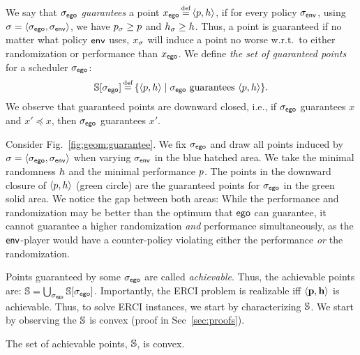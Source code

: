 We say that ${\sigma_{\mathsf{ego}}}$ \emph{guarantees} a point $x_\pOne \eqdef
\langle \scp, \rndp \rangle$, if for every policy ${\sigma_{\mathsf{env}}}$, using
$\sigma = \langle {\sigma_{\mathsf{ego}}}, {\sigma_{\mathsf{env}}} \rangle$, we have
$p_\sigma \geq p$ and $h_\sigma \geq h$. Thus, a point
is guaranteed if no matter what policy $\mathsf{env}$ uses, $x_\sigma$ will
induce a point no worse w.r.t.\ to either randomization or performance
than $x_{\mathsf{ego}}$. 
We define
\emph{the set of guaranteed points} for a scheduler ${\sigma_{\mathsf{ego}}}$:
\begin{equation}\label{eq:guaranteed}
  \solutions[\pOneSched] \eqdef \{ \langle \scp, \rndp \rangle \mid  \pOneSched \text{ guarantees } \langle \scp, \rndp \rangle \}.
\end{equation}
We observe that guaranteed points are
downward closed, i.e., if ${\sigma_{\mathsf{ego}}}$ guarantees $x$ and $x' \preceq x$,
then ${\sigma_{\mathsf{ego}}}$ guarantees $x'$.
\begin{example}
Consider Fig.~\ref{fig:geom:guarantee}. We fix ${\sigma_{\mathsf{ego}}}$ and draw all points induced by $\sigma = \langle {\sigma_{\mathsf{ego}}}, {\sigma_{\mathsf{env}}} \rangle$ when varying ${\sigma_{\mathsf{env}}}$ in the blue hatched area. We take the minimal randomness $h$ and the minimal performance $p$. The points in the downward closure  of $\langle p, h \rangle$ (green circle) are the guaranteed points for ${\sigma_{\mathsf{ego}}}$ in the green solid area.	
We notice the gap between both areas: While the performance and randomization may be better than the optimum that $\mathsf{ego}$ can guarantee, it cannot guarantee a higher randomization \emph{and} performance simultaneously, as  the $\mathsf{env}$-player would have a counter-policy violating either the performance \emph{or} the randomization.
\end{example}

Points guaranteed by some ${\sigma_{\mathsf{ego}}}$ are called
\emph{achievable}. Thus, the achievable points are: $ \mathbb{S} =
\bigcup_{{\sigma_{\mathsf{ego}}}} \mathbb{S}[{\sigma_{\mathsf{ego}}}]$.  Importantly, the ERCI problem is realizable iff $\langle \mathbf{p},
\mathbf{h} \rangle$ is achievable. 
Thus, to solve ERCI instances, we start by characterizing
$\mathbb{S}$. We start by observing the $\mathbb{S}$ is convex (proof in Sec~\ref{sec:proofs}).


\begin{proposition}\label{prop:convex}
  The set of achievable points, $\mathbb{S}$, is convex. 
\end{proposition}


